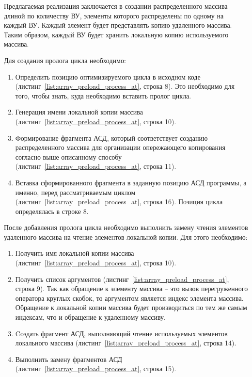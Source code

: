 Предлагаемая реализация заключается в создании распределенного массива длиной по 
количеству ВУ, элементы которого распределены по одному на каждый ВУ. Каждый 
элемент будет представлять копию удаленного массива. Таким образом, каждый ВУ 
будет хранить локальную копию используемого массива.

\noindent Для создания пролога цикла необходимо:
\begin{enumerate}
	\item Определить позицию оптимизируемого цикла в исходном коде 
(листинг~\ref{list:array_preload_process_at}, строка 8). Это необходимо для 
того, чтобы знать, куда необходимо вставить пролог цикла.
	\item Генерация имени локальной копии массива 
(листинг~\ref{list:array_preload_process_at}, строка 10).
	\item Формирование фрагмента АСД, который соответствует созданию 
распределенного массива для организации опережающего копирования согласно выше 
описанному способу (листинг~\ref{list:array_preload_process_at}, строка 11).
	\item Вставка сформированного фрагмента в заданную позицию АСД программы, а 
именно, перед рассматриваемым циклом 
(листинг~\ref{list:array_preload_process_at}, строка 16). Позиция цикла 
определялась в строке 8.
\end{enumerate}

\noindent После добавления пролога цикла необходимо выполнить замену чтения 
элементов удаленного массива на чтение элементов локальной копии. Для этого 
необходимо: 
\begin{enumerate}
	\item Получить имя локальной копии массива 
(листинг~\ref{list:array_preload_process_at}, строка 10).
	\item Получить список аргументов (листинг~\ref{list:array_preload_process_at}, 
строка 9). Так как обращение к элементу массива -- это вызов перегруженного 
оператора круглых скобок, то аргументом является индекс элемента массива. 
Обращение к локальной копии массива будет производиться по тем же самым 
индексам, что и обращение к удаленному массиву.
	\item Cоздать фрагмент АСД, выполняющий чтение используемых элементов 
локального массива (листинг~\ref{list:array_preload_process_at}, строка 14).
	\item Выполнить замену фрагментов АСД 
(листинг~\ref{list:array_preload_process_at}, строка 15).
\end{enumerate}

